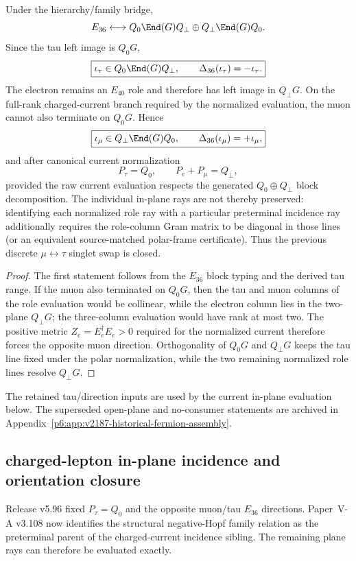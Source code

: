 \documentclass[12pt,a4paper]{article}
\begin{document}
\begin{corollary}
\label{p6:cor:v596-mu-tau-e36-directions}
Under the hierarchy/family bridge,
\[
 E_{36}\longleftrightarrow
 Q_0\End(G)Q_\perp\oplus Q_\perp\End(G)Q_0.
\]
Since the tau left image is $Q_0G$,
\[
 \boxed{\iota_\tau\in Q_0\End(G)Q_\perp,\qquad
 \Delta_{36}(\iota_\tau)=-\iota_\tau.}
\]
The electron remains an $E_{40}$ role and therefore has left image in
$Q_\perp G$.  On the full-rank charged-current branch required by the
normalized evaluation, the muon cannot also terminate on $Q_0G$.  Hence
\[
 \boxed{\iota_\mu\in Q_\perp\End(G)Q_0,\qquad
 \Delta_{36}(\iota_\mu)=+\iota_\mu,}
\]
and after canonical current normalization
\[
 \boxed{P_\tau=Q_0,\qquad P_e+P_\mu=Q_\perp,}
\]
provided the raw current evaluation respects the generated
\(Q_0\oplus Q_\perp\) block decomposition. The individual in-plane
rays are not thereby preserved: identifying each normalized role ray with
a particular preterminal incidence ray additionally requires the role-column
Gram matrix to be diagonal in those lines (or an equivalent source-matched
polar-frame certificate).
Thus the previous discrete $\mu\leftrightarrow\tau$ singlet swap is closed.
\end{corollary}
\begin{proof}
The first statement follows from the $E_{36}$ block typing and the derived tau
range.  If the muon also terminated on $Q_0G$, then the tau and muon columns of
the role evaluation would be collinear, while the electron column lies in the
two-plane $Q_\perp G$; the three-column evaluation would have rank at most two.
The positive metric $Z_e=E_e^\dagger E_e>0$ required for the normalized current
therefore forces the opposite muon direction.  Orthogonality of $Q_0G$ and
$Q_\perp G$ keeps the tau line fixed under the polar normalization, while the
two remaining normalized role lines resolve $Q_\perp G$.
\end{proof}




The retained tau/direction inputs are used by the current in-plane
evaluation below. The superseded open-plane and no-consumer statements are
archived in Appendix~\ref{p6:app:v2187-historical-fermion-assembly}.



\subsection{charged-lepton in-plane incidence and orientation closure}
\label{p6:sec:v597-lepton-inplane-closure}
Release v5.96 fixed $P_\tau=Q_0$ and the opposite muon/tau $E_{36}$
directions.  Paper~V-A v3.108 now identifies the structural negative-Hopf
family relation as the preterminal parent of the charged-current incidence
sibling.  The remaining plane rays can therefore be evaluated exactly.
\end{document}
